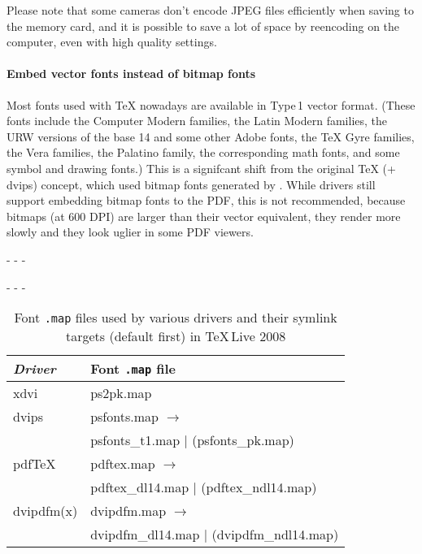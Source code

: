 \documentclass{ltugproc}
\def\cmd{\textsf}
\def\pkg{\textsf}
\def\captiontop#1{%
  \advance\abovecaptionskip-\belowcaptionskip
  \advance\belowcaptionskip\abovecaptionskip
  \advance\abovecaptionskip-\belowcaptionskip
  \abovecaptionskip-\abovecaptionskip
  \caption{#1}%
  \advance\abovecaptionskip-\belowcaptionskip
  \advance\belowcaptionskip\abovecaptionskip
  \advance\abovecaptionskip-\belowcaptionskip
  \abovecaptionskip-\abovecaptionskip
}
\begin{document}
Please note that some cameras don't encode JPEG files efficiently when
saving to the memory card, and it is possible to save a lot of space by
reencoding on the computer, even with high quality settings.

\paragraph{Embed vector fonts instead of bitmap fonts}

Most fonts used with \TeX{} nowadays are available in Type\,1 vector format.
(These fonts include the Computer Modern families, the Latin Modern families,
the URW versions of the base 14 and some other Adobe fonts,
the \TeX{} Gyre families, the Vera families, the Palatino family, the
corresponding math fonts, and some symbol and drawing fonts.) This is a
signifcant shift from the original \TeX{} (+ \cmd{dvips}) concept, which used
bitmap fonts generated by \MF{}. While drivers still support embedding
bitmap fonts to the PDF, this is not recommended, because bitmaps (at 600
DPI) are larger than their vector equivalent, they render more slowly and
they look uglier in some PDF viewers.

\begin{table}
\captiontop{Font \texttt{.map} files used by various drivers and their
symlink targets (default first) in \TeX{}\,Live 2008}\label{tab:mapfiles}
\par\small\noindent\hfil
\begin{tabular}{@{}ll@{}}
\toprule
\emph{Driver} & Font \texttt{.map} file\\
\midrule
\cmd{xdvi} & \pkg{ps2pk.map} \\
\cmd{dvips}& \pkg{psfonts.map} $\to$\\
           & \pkg{psfonts\_t1.map} $|$ (\pkg{psfonts\_pk.map}) \\
pdf\TeX{}  & \pkg{pdftex.map} $\to$\\
           & \pkg{pdftex\_dl14.map} $|$ (\pkg{pdftex\_ndl14.map}) \\
\cmd{dvipdfm(x)}& \pkg{dvipdfm.map} $\to$\\
                & \pkg{dvipdfm\_dl14.map} $|$ (\pkg{dvipdfm\_ndl14.map}) \\
\bottomrule
\end{tabular}
\end{table}
\end{document}
